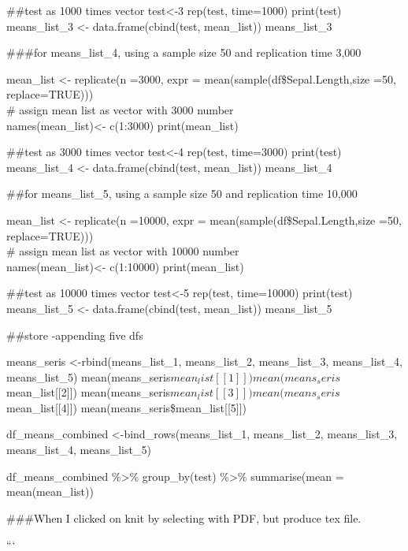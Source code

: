 \documentclass[
]{article}
\begin{document}
\#\#test as 1000 times vector test\textless-3 rep(test, time=1000)
print(test) means\_list\_3 \textless- data.frame(cbind(test,
mean\_list)) means\_list\_3

\#\#\#for means\_list\_4, using a sample size 50 and replication time
3,000

mean\_list \textless- replicate(n =3000, expr =
mean(sample(df\$Sepal.Length,size =50, replace=TRUE)))\\
\# assign mean list as vector with 3000 number\\
names(mean\_list)\textless- c(1:3000) print(mean\_list)

\#\#test as 3000 times vector test\textless-4 rep(test, time=3000)
print(test) means\_list\_4 \textless- data.frame(cbind(test,
mean\_list)) means\_list\_4

\#\#for means\_list\_5, using a sample size 50 and replication time
10,000

mean\_list \textless- replicate(n =10000, expr =
mean(sample(df\$Sepal.Length,size =50, replace=TRUE)))\\
\# assign mean list as vector with 10000 number\\
names(mean\_list)\textless- c(1:10000) print(mean\_list)

\#\#test as 10000 times vector test\textless-5 rep(test, time=10000)
print(test) means\_list\_5 \textless- data.frame(cbind(test,
mean\_list)) means\_list\_5

\#\#store -appending five dfs

means\_seris \textless-rbind(means\_list\_1, means\_list\_2,
means\_list\_3, means\_list\_4, means\_list\_5)
mean(means\_seris\(mean_list[[1]]) mean(means_seris\)mean\_list{[}{[}2{]}{]})
mean(means\_seris\(mean_list[[3]]) mean(means_seris\)mean\_list{[}{[}4{]}{]})
mean(means\_seris\$mean\_list{[}{[}5{]}{]})

df\_means\_combined \textless-bind\_rows(means\_list\_1, means\_list\_2,
means\_list\_3, means\_list\_4, means\_list\_5)

df\_means\_combined \%\textgreater\% group\_by(test) \%\textgreater\%
summarise(mean = mean(mean\_list))

\#\#\#When I clicked on knit by selecting with PDF, but produce tex
file.

```
\end{document}
